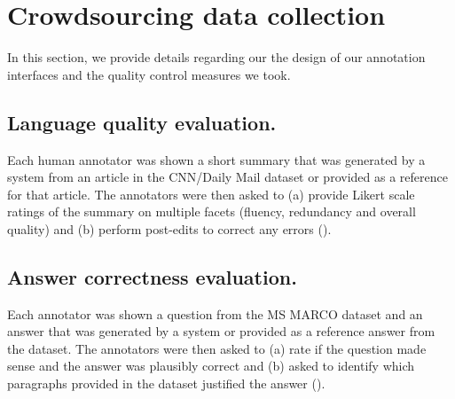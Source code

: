 \section{\label{sec:interfaces} Crowdsourcing data collection}

In this section, we provide details regarding our the design of our annotation interfaces and the quality control measures we took.

\subsection{Language quality evaluation.}
Each human annotator was shown a short summary that was generated by a system from an article in the CNN/Daily Mail dataset or provided as a reference for that article.
The annotators were then asked to (a) provide Likert scale ratings of the summary on multiple facets (fluency, redundancy and overall quality) and (b) perform post-edits to correct any errors ().

\subsection{Answer correctness evaluation.}
Each annotator was shown a question from the MS MARCO dataset and an answer that was generated by a system or provided as a reference answer from the dataset.
The annotators were then asked to (a) rate if the question made sense and the answer was plausibly correct and (b) asked to identify which paragraphs provided in the dataset justified the answer ().

%
